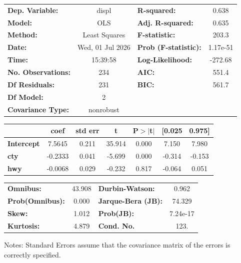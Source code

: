 \begin{center}
\begin{tabular}{lclc}
\toprule
\textbf{Dep. Variable:}    &      displ       & \textbf{  R-squared:         } &     0.638   \\
\textbf{Model:}            &       OLS        & \textbf{  Adj. R-squared:    } &     0.635   \\
\textbf{Method:}           &  Least Squares   & \textbf{  F-statistic:       } &     203.3   \\
\textbf{Date:}             & Wed, 01 Jul 2026 & \textbf{  Prob (F-statistic):} &  1.17e-51   \\
\textbf{Time:}             &     15:39:58     & \textbf{  Log-Likelihood:    } &   -272.68   \\
\textbf{No. Observations:} &         234      & \textbf{  AIC:               } &     551.4   \\
\textbf{Df Residuals:}     &         231      & \textbf{  BIC:               } &     561.7   \\
\textbf{Df Model:}         &           2      & \textbf{                     } &             \\
\textbf{Covariance Type:}  &    nonrobust     & \textbf{                     } &             \\
\bottomrule
\end{tabular}
\begin{tabular}{lcccccc}
                   & \textbf{coef} & \textbf{std err} & \textbf{t} & \textbf{P$> |$t$|$} & \textbf{[0.025} & \textbf{0.975]}  \\
\midrule
\textbf{Intercept} &       7.5645  &        0.211     &    35.914  &         0.000        &        7.150    &        7.980     \\
\textbf{cty}       &      -0.2333  &        0.041     &    -5.699  &         0.000        &       -0.314    &       -0.153     \\
\textbf{hwy}       &      -0.0068  &        0.029     &    -0.232  &         0.817        &       -0.064    &        0.051     \\
\bottomrule
\end{tabular}
\begin{tabular}{lclc}
\textbf{Omnibus:}       & 43.908 & \textbf{  Durbin-Watson:     } &    0.962  \\
\textbf{Prob(Omnibus):} &  0.000 & \textbf{  Jarque-Bera (JB):  } &   74.329  \\
\textbf{Skew:}          &  1.012 & \textbf{  Prob(JB):          } & 7.24e-17  \\
\textbf{Kurtosis:}      &  4.879 & \textbf{  Cond. No.          } &     123.  \\
\bottomrule
\end{tabular}
\end{center}

Notes: \newline
 [1] Standard Errors assume that the covariance matrix of the errors is correctly specified.